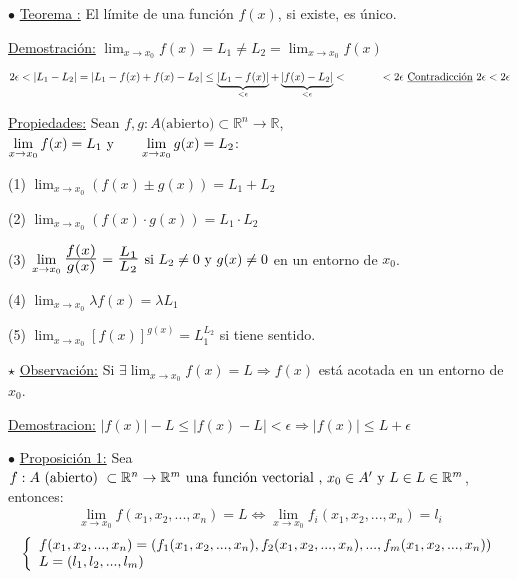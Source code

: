 \documentclass[12pt, titlepage]{article}
\newcommand{\R}{\mathbb{R}}
\newcommand{\bfrac}[2]{\scalebox{1.4}{$\frac{#1}{#2}$}}
\newcommand{\teorema}[1][\!\!]{\noindent$\bullet$ \underline{Teorema #1:} }
\newcommand{\proposicion}[1][\!\!]{\noindent$\bullet$ \underline{Proposición #1:} }
\newcommand{\observacion}{\noindent$\star$ \underline{Observación:} }
\begin{document}
\teorema El límite de una función $f (x)$, si existe, es único.
\vspace{3mm}

\underline{Demostración:} $\displaystyle \lim_{x \to x_0} f (x) = L_1 \neq L_2 = \lim_{x \to x_0} f (x)$

\indent\indent$2 \epsilon < |L_1 - L_2| = |L_1 - f(x) + f(x) - L_2| \leq \underbrace{|L_1 - f(x)|}_{< \epsilon} + \underbrace{|f (x) - L_2|}_{< \epsilon} < \\ \indent\indent < 2 \epsilon \text{ \underline{Contradicción} }
 2 \epsilon < 2 \epsilon$
\vspace{5mm}

\underline{Propiedades:} Sean $f, g : A \text{(abierto)} \subset \R^n \to \R$, $\displaystyle
\lim_{x \to x_0} f (x) = L_1 \text{ y } \\ \indent \lim_{x \to x_0} g (x) = L_2$:
\vspace{3mm}

(1) $\displaystyle \lim_{x \to x_0} (f (x) \pm g (x)) = L_1 + L_2$
\vspace{3mm}

(2) $\displaystyle \lim_{x \to x_0} (f (x) \cdot g (x)) = L_1 \cdot L_2$
\vspace{3mm}

(3) $\displaystyle \lim_{x \to x_0} \bfrac{f (x)}{g (x)} = \bfrac{L_1}{L_2} \text{ si } L_2 \neq 0 \text{ y } 
g (x) \neq 0$ en un entorno de $x_0$.
\vspace{3mm}

(4) $\displaystyle \lim_{x \to x_0} \lambda f (x) = \lambda L_1$
\vspace{3mm}

(5) $\displaystyle \lim_{x \to x_0} [f (x)]^{g (x)} = L_1^{L_2}$ si tiene sentido.
\vspace{3mm}

\observacion Si $\exists \displaystyle \lim_{x \to x_0} f (x) = L \Rightarrow f (x)$ está acotada en un entorno
 de $x_0$.
\vspace{1mm}

\underline{Demostracion:} $| f (x) | - L \leq |f (x) - L|< \epsilon \Rightarrow |f (x)| \leq L + \epsilon$
\vspace{5mm}

\proposicion[1] Sea $f : A \text{ (abierto) }  \subset \R^n \rightarrow \R^m \text{ una función 
vectorial , } \vspace{1mm} \\  x_0 \in A' \text{ y } L \in L \in \R^m$, entonces:
\[
\boxed{
\displaystyle \lim_{x \to x_0}^{} f (x_1, x_2,...,x_n) = L \iff \lim_{x \to x_0} f_i (x_1, x_2,..., x_n) = l_i
}
\]
\[
\\\left \{\begin{array}{lc}
f (x_1, x_2,...,x_n) = (f_1 (x_1, x_2,..., x_n), f_2 (x_1, x_2,..., x_n),..., f_m (x_1, x_2,..., x_n)) \\
L = (l_1, l_2,..., l_m)
\end{array}\right.
\]
\vspace{3mm}
\end{document}
